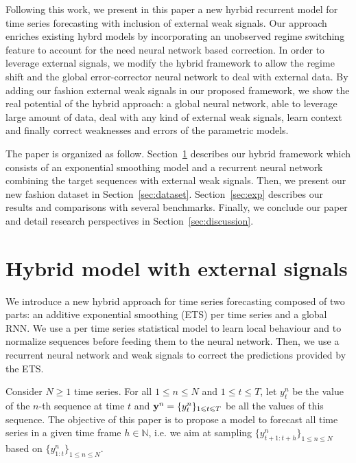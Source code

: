 \documentclass[letterpaper]{article} %
\newcommand{\ts}{y}
\newcommand{\fullts}{{\bf \ts}}
\newcommand{\lag}{h}
\begin{document}
Following this work, we present in this paper a new hyrbid recurrent model for time series forecasting with inclusion of external weak signals. %
Our approach enriches existing hybrd models  by incorporating an unobserved regime switching feature to account for the need neural network based correction. In order to leverage external signals, we modify the hybrid framework to allow the regime shift and the  global error-corrector neural network to deal with external data. By adding our fashion external weak signals in our proposed framework, we show the real potential of the hybrid approach: a global neural network, able to leverage large amount of data, deal with any kind of external weak signals, learn context and finally correct weaknesses and errors of the parametric models.

The paper is organized as follow. Section~\ref{sec:hybrid} describes our hybrid framework which consists of an exponential smoothing model and a recurrent neural network combining the target sequences with external weak signals. Then, we present our new fashion dataset in Section~\ref{sec:dataset}. Section~\ref{sec:exp} describes our results and comparisons with several benchmarks. Finally, we conclude our paper and detail research perspectives in Section~\ref{sec:discussion}.


\section{Hybrid model with external signals}
\label{sec:hybrid}
We introduce a new hybrid approach for time series forecasting  composed of two parts: an additive exponential smoothing (ETS) per time series and a global RNN. We use a per time series statistical model to learn local behaviour and to normalize sequences before feeding them to the neural network. Then, we use a recurrent neural network and weak signals to correct the predictions provided by the ETS.

Consider $N\geqslant 1$ time series. For all $1\leqslant n \leqslant N$ and $1\leqslant t \leqslant T$, let $\ts_t^n$ be the value of the $n$-th sequence at time $t$ and  $\fullts^n = \{\ts_t^n\}_{1\leqslant t \leqslant T}$ be all the values of this sequence.   The objective of this paper is to propose a model to  forecast all time series in a given time frame  $\lag \in \mathbb{N}$, i.e. we aim at sampling $\{\ts^n_{t+1:t+\lag}\}_{1\leqslant n \leqslant N}$ based on $\{\ts^n_{1:t}\}_{1\leqslant n \leqslant N}$.
\end{document}
